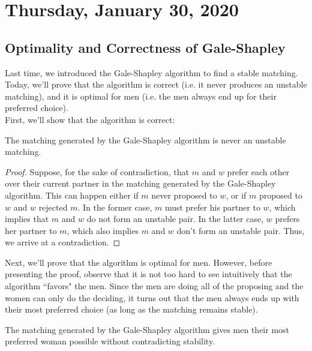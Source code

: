 \newpage
\section{Thursday, January 30, 2020}

\subsection{Optimality and Correctness of Gale-Shapley}


Last time, we introduced the Gale-Shapley algorithm to find a stable matching. Today, we'll prove that the algorithm is correct (i.e. it never produces an unstable matching), and it is optimal for men (i.e. the men always end up for their preferred choice). \\

First, we'll show that the algorithm is correct: \\

\begin{proposition}
The matching generated by the Gale-Shapley algorithm is never an unstable matching.  
\end{proposition}

\begin{proof}
Suppose, for the sake of contradiction, that $m$ and $w$ prefer each other over their current partner in the matching generated by the Gale-Shapley algorithm. This can happen either if $m$ never proposed to $w$, or if $m$ proposed to $w$ and $w$ rejected $m$. In the former case, $m$ must prefer his partner to $w$, which implies that $m$ and $w$ do not form an unstable pair. In the latter case, $w$ prefers her partner to $m$, which also implies $m$ and $w$ don't form an unstable pair. Thus, we arrive at a contradiction. 
\end{proof}

Next, we'll prove that the algorithm is optimal for men. However, before presenting the proof, observe that it is not too hard to see intuitively that the algorithm ``favors" the men. Since the men are doing all of the proposing and the women can only do the deciding, it turns out that the men always ends up with their most preferred choice (as long as the matching remains stable).

\begin{proposition}
The matching generated by the Gale-Shapley algorithm gives men their most preferred woman possible without contradicting stability. 
\end{proposition}

